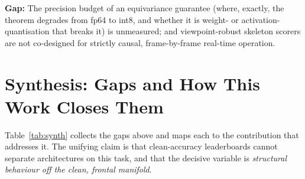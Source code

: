 \documentclass[11pt]{article}
\newcommand{\gap}[1]{\textbf{\textcolor{red!60!black}{Gap:} } #1}
\begin{document}
\gap{The precision budget of an equivariance guarantee (where, exactly, the theorem
degrades from fp64 to int8, and whether it is weight- or activation-quantisation
that breaks it) is unmeasured; and viewpoint-robust skeleton scorers are not
co-designed for strictly causal, frame-by-frame real-time operation.}

\section{Synthesis: Gaps and How This Work Closes Them}
\label{sec:synth}

Table~\ref{tab:synth} collects the gaps above and maps each to the contribution
that addresses it. The unifying claim is that clean-accuracy leaderboards cannot
separate architectures on this task, and that the decisive variable is
\emph{structural behaviour off the clean, frontal manifold}.
\end{document}
